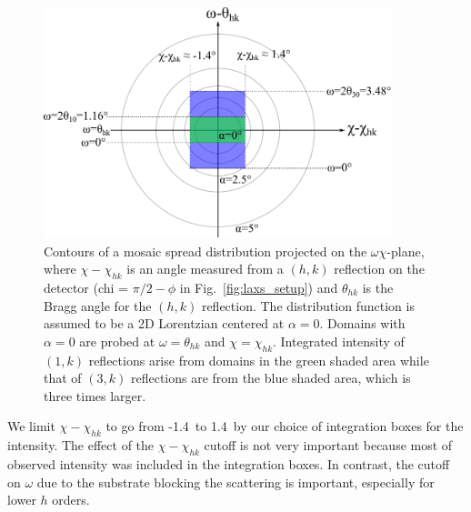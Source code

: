 \begin{figure}[htbp]
  \centering
  \includegraphics[width=0.9\textwidth]{figures/ripple/analysis/mosaic_contour}
  \caption[Contours of a mosaic spread distribution projected on the $\omega\chi$-plane,
  where $\chi-\chi_{hk}$ is an angle measured from a $(h,k)$ reflection on the detector
  ($\chi=\pi/2-\phi$ in Fig.~\ref{fig:laxs_setup}) and $\theta_{hk}$ is the
  Bragg angle for the $(h,k)$ reflection]
  {Contours of a mosaic spread distribution projected on the $\omega\chi$-plane,
  where $\chi-\chi_{hk}$ is an angle measured from a $(h,k)$ reflection on the detector
  (\gls{chi} = $\pi/2-\phi$ in Fig.~\ref{fig:laxs_setup}) and $\theta_{hk}$ is the
  Bragg angle for the $(h,k)$ reflection.
  The distribution function is assumed to be a 2D Lorentzian centered at $\alpha=0$.
  Domains with $\alpha=0$ are probed at $\omega=\theta_{hk}$ and $\chi=\chi_{hk}$.
  Integrated intensity of $(1,k)$ reflections arise from domains in the green
  shaded area while that of $(3,k)$ reflections are from the
  blue shaded area, which is three times larger.}
  \label{fig:mosaic_contour} 
\end{figure}

We limit $\chi-\chi_{hk}$ to go from -1.4\textdegree\ to 1.4\textdegree\
by our choice of integration boxes for the intensity.  
The effect of the $\chi-\chi_{hk}$ cutoff is not very important
because most of observed intensity was included in the integration boxes.
In contrast, the cutoff on $\omega$ due to the
substrate blocking the scattering
is important, especially for lower $h$ orders.
 
